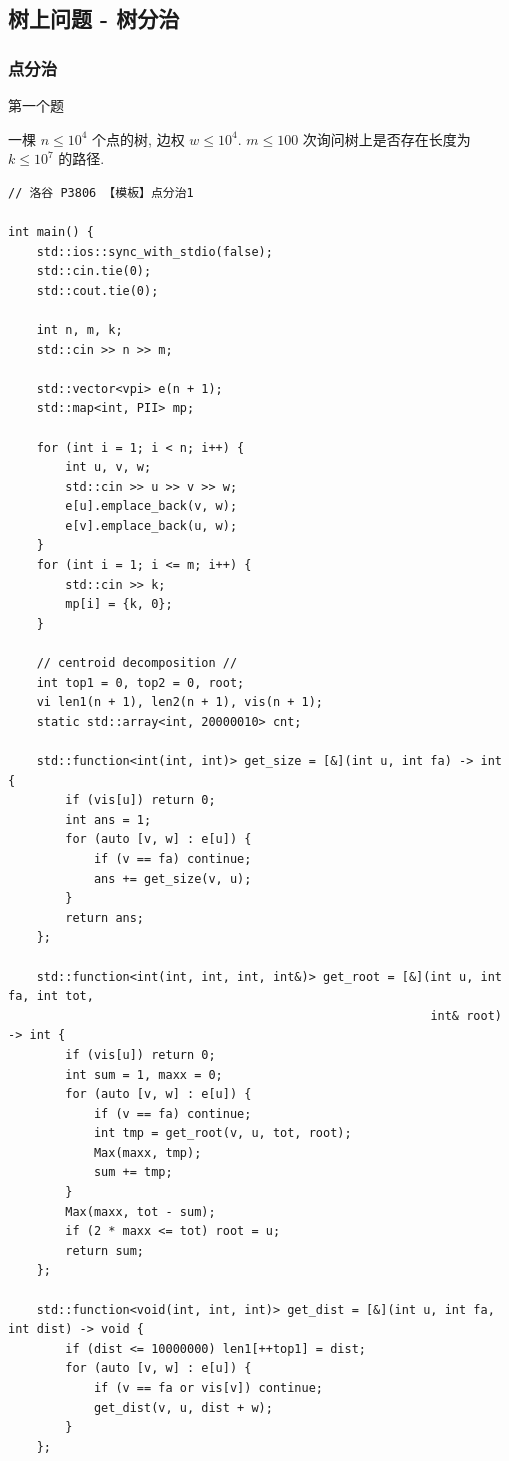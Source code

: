 \documentclass[UTF8, a4paper, titlepage, twoside]{ctexart}
\begin{document}
\subsection{ 树上问题 - 树分治 }
\subsubsection{ 点分治 }
第一个题

一棵 $n \leqslant 10^4$ 个点的树, 边权 $w \leqslant 10^4$.  $m \leqslant 100$ 次询问树上是否存在长度为 $k \leqslant 10^7$ 的路径. 
\begin{lstlisting}[style=cpp]
// 洛谷 P3806 【模板】点分治1

int main() {
    std::ios::sync_with_stdio(false);
    std::cin.tie(0);
    std::cout.tie(0);

    int n, m, k;
    std::cin >> n >> m;

    std::vector<vpi> e(n + 1);
    std::map<int, PII> mp;

    for (int i = 1; i < n; i++) {
        int u, v, w;
        std::cin >> u >> v >> w;
        e[u].emplace_back(v, w);
        e[v].emplace_back(u, w);
    }
    for (int i = 1; i <= m; i++) {
        std::cin >> k;
        mp[i] = {k, 0};
    }

    // centroid decomposition //
    int top1 = 0, top2 = 0, root;
    vi len1(n + 1), len2(n + 1), vis(n + 1);
    static std::array<int, 20000010> cnt;

    std::function<int(int, int)> get_size = [&](int u, int fa) -> int {
        if (vis[u]) return 0;
        int ans = 1;
        for (auto [v, w] : e[u]) {
            if (v == fa) continue;
            ans += get_size(v, u);
        }
        return ans;
    };

    std::function<int(int, int, int, int&)> get_root = [&](int u, int fa, int tot,
                                                           int& root) -> int {
        if (vis[u]) return 0;
        int sum = 1, maxx = 0;
        for (auto [v, w] : e[u]) {
            if (v == fa) continue;
            int tmp = get_root(v, u, tot, root);
            Max(maxx, tmp);
            sum += tmp;
        }
        Max(maxx, tot - sum);
        if (2 * maxx <= tot) root = u;
        return sum;
    };

    std::function<void(int, int, int)> get_dist = [&](int u, int fa, int dist) -> void {
        if (dist <= 10000000) len1[++top1] = dist;
        for (auto [v, w] : e[u]) {
            if (v == fa or vis[v]) continue;
            get_dist(v, u, dist + w);
        }
    };


\end{lstlisting}
\end{document}
